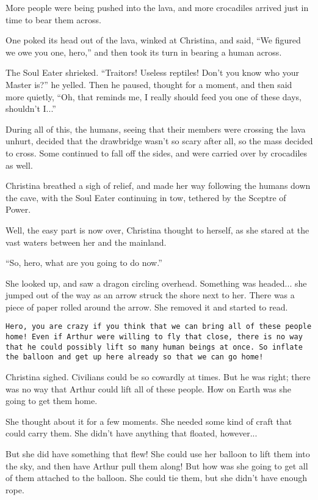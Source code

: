 \documentclass[showtrims,b6paper,draft,10pt]{memoir}
\begin{document}
More people were being pushed into the lava, and more crocadiles arrived just in time to bear them across.

One poked its head out of the lava, winked at Christina, and said, ``We figured we owe you one, hero,'' and then took its turn in bearing a human across.

The Soul Eater shrieked.  ``Traitors!  Useless reptiles!  Don't you know who your Master is?'' he yelled.  Then he paused, thought for a moment, and then said more quietly,  ``Oh, that reminds me, I really should feed you one of these days, shouldn't I...''

During all of this, the humans, seeing that their members were crossing the lava unhurt, decided that the drawbridge wasn't so scary after all, so the mass decided to cross.  Some continued to fall off the sides, and were carried over by crocadiles as well.

Christina breathed a sigh of relief, and made her way following the humans down the cave, with the Soul Eater continuing in tow, tethered by the Sceptre of Power.

\timeskip
Well, the easy part is now over, Christina thought to herself, as she stared at the vast waters between her and the mainland.

``So, hero, what are you going to do now.''

She looked up, and saw a dragon circling overhead.  Something was headed... she jumped out of the way as an arrow struck the shore next to her.  There was a piece of paper rolled around the arrow.  She removed it and started to read.

\texttt{Hero, you are crazy if you think that we can bring all of these people home!  Even if Arthur were willing to fly that close, there is no way that he could possibly lift so many human beings at once.  So inflate the balloon and get up here already so that we can go home!}

Christina sighed.  Civilians could be so cowardly at times.  But he was right;  there was no way that Arthur could lift all of these people.  How on Earth was she going to get them home.

She thought about it for a few moments.  She needed some kind of craft that could carry them.  She didn't have anything that floated, however...

But she did have something that flew!  She could use her balloon to lift them into the sky, and then have Arthur pull them along!  But how was she going to get all of them attached to the balloon.  She could tie them, but she didn't have enough rope.
\end{document}
